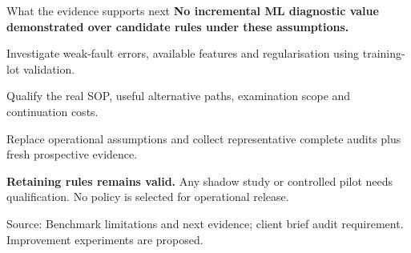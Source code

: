 \documentclass[aspectratio=169,11pt]{beamer}
\newcommand{\lead}[1]{{\large\bfseries #1}\par\medskip}
\newcommand{\source}[1]{\vfill{\fontsize{6.6}{8}\selectfont\color{Muted}Source: #1\par}}
\newcommand{\smalltext}[1]{{\fontsize{9}{11.4}\selectfont #1\par}}
\begin{document}
\begin{frame}[t]{What the evidence supports next}
  \lead{No incremental ML diagnostic value demonstrated\newline
    over candidate rules under these assumptions.}
  \vspace{1mm}
  \begin{description}
    \setlength{\itemsep}{2.4mm}
    \item[Prediction] Investigate weak-fault errors, available features and
      regularisation using training-lot validation.
    \item[Decision] Qualify the real SOP, useful alternative paths,
      examination scope and continuation costs.
    \item[Evidence] Replace operational assumptions and collect representative
      complete audits plus fresh prospective evidence.
  \end{description}
  \vspace{3mm}
  \smalltext{\textbf{Retaining rules remains valid.} Any shadow study or controlled pilot
    needs qualification. No policy is selected for operational release.}
  \source{Benchmark limitations and next evidence; client brief audit requirement. Improvement experiments are proposed.}
  \note{\SlideEightNotes}
\end{frame}
\end{document}
